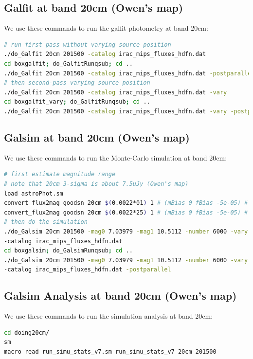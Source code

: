 \documentclass[11pt,a4paper]{article}
\begin{document}
\subsection{Galfit at band 20cm (Owen's map)}

We use these commands to run the galfit photometry at band 20cm:

\begin{lstlisting}[language=bash]
# run first-pass without varying source position
./do_Galfit 20cm 201500 -catalog irac_mips_fluxes_hdfn.dat
cd boxgalfit; do_GalfitRunqsub; cd ..
./do_Galfit 20cm 201500 -catalog irac_mips_fluxes_hdfn.dat -postparallel
# then second-pass varying source position
./do_Galfit 20cm 201500 -catalog irac_mips_fluxes_hdfn.dat -vary
cd boxgalfit_vary; do_GalfitRunqsub; cd ..
./do_Galfit 20cm 201500 -catalog irac_mips_fluxes_hdfn.dat -vary -postparallel
\end{lstlisting}

\subsection{Galsim at band 20cm (Owen's map)}

We use these commands to run the Monte-Carlo simulation at band 20cm:

\begin{lstlisting}[language=bash]
# first estimate magnitude range
# note that 20cm 3-sigma is about 7.5uJy (Owen's map)
load astroPhot.sm
convert_flux2mag goodsn 20cm $(0.0022*01) 1 # (mBias 0 fBias -5e-05) # => 10.5112
convert_flux2mag goodsn 20cm $(0.0022*25) 1 # (mBias 0 fBias -5e-05) # => 7.03979
# then do the simulation
./do_Galsim 20cm 201500 -mag0 7.03979 -mag1 10.5112 -number 6000 -vary \
-catalog irac_mips_fluxes_hdfn.dat
cd boxgalsim; do_GalsimRunqsub; cd ..
./do_Galsim 20cm 201500 -mag0 7.03979 -mag1 10.5112 -number 6000 -vary \
-catalog irac_mips_fluxes_hdfn.dat -postparallel
\end{lstlisting}

\subsection{Galsim Analysis at band 20cm (Owen's map)}

We use these commands to run the simulation analysis at band 20cm:

\begin{lstlisting}[language=bash]
cd doing20cm/
sm
macro read run_simu_stats_v7.sm run_simu_stats_v7 20cm 201500
\end{lstlisting}
\end{document}
